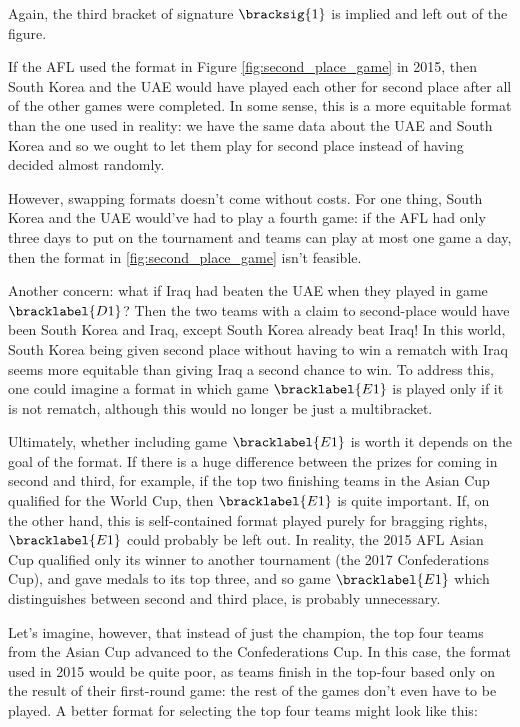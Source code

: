 {    Again, the third bracket of signature $\bracksig{1}$ is implied and left out of the figure.

    If the AFL used the format in Figure \ref{fig:second_place_game} in 2015, then South Korea and the UAE would have played each other for second place after all of the other games were completed. In some sense, this is a more equitable format than the one used in reality: we have the same data about the UAE and South Korea and so we ought to let them play for second place instead of having decided almost randomly.

    However, swapping formats doesn't come without costs. For one thing, South Korea and the UAE would've had to play a fourth game: if the AFL had only three days to put on the tournament and teams can play at most one game a day, then the format in \ref{fig:second_place_game} isn't feasible.

    Another concern: what if Iraq had beaten the UAE when they played in game $\bracklabel{D1}$? Then the two teams with a claim to second-place would have been South Korea and Iraq, except South Korea already beat Iraq! In this world, South Korea being given second place without having to win a rematch with Iraq seems more equitable than giving Iraq a second chance to win. To address this, one could imagine a format in which game $\bracklabel{E1}$ is played only if it is not rematch, although this would no longer be just a multibracket.

    Ultimately, whether including game $\bracklabel{E1}$ is worth it depends on the goal of the format. If there is a huge difference between the prizes for coming in second and third, for example, if the top two finishing teams in the Asian Cup qualified for the World Cup, then $\bracklabel{E1}$ is quite important. If, on the other hand, this is self-contained format played purely for bragging rights, $\bracklabel{E1}$ could probably be left out. In reality, the 2015 AFL Asian Cup qualified only its winner to another tournament (the 2017 Confederations Cup), and gave medals to its top three, and so game $\bracklabel{E1}$ which distinguishes between second and third place, is probably unnecessary.

    Let's imagine, however, that instead of just the champion, the top four teams from the Asian Cup advanced to the Confederations Cup. In this case, the format used in 2015 would be quite poor, as teams finish in the top-four based only on the result of their first-round game: the rest of the games don't even have to be played. A better format for selecting the top four teams might look like this:

}
